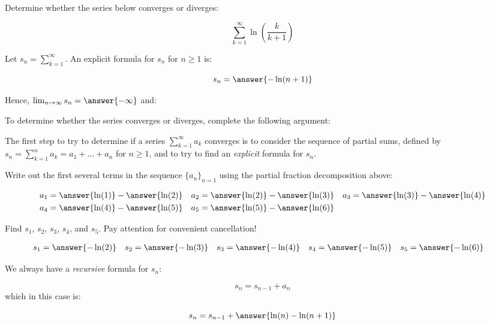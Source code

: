 \documentclass{ximera}
\author{Jim Talamo}
\begin{document}
\begin{exercise}
Determine whether the series below converges or diverges:

\[
\sum_{k=1}^{\infty} \ln \left(\frac{k}{k+1}\right)
\]

Let $s_n = \sum_{k=1}^{\infty}$.  An explicit formula for $s_n$ for $n \geq 1$ is:

\[
s_n = \answer{-\ln(n+1)}
\]

\begin{exercise}
Hence, $\lim_{n \to \infty} s_n = \answer{-\infty}$ and:

\begin{multipleChoice}
\end{multipleChoice}

\begin{hint}
To determine whether the series converges or diverges, complete the following argument:

The first step to try to determine if a series $\sum_{k=1}^{\infty}a_k$ converges is to consider the sequence of partial sums, defined by $s_n = \sum_{k=1}^{n} a_k = a_1+\ldots + a_n$ for $n \geq 1$, and to try to find an \emph{explicit} formula for $s_n$.


Write out the first several terms in the sequence $\{a_n\}_{n=1}$ using the partial fraction decomposition above:

\begin{align*}
a_1 &= \answer{\ln(1)} - \answer{\ln(2)} & a_2 &= \answer{\ln(2)}-\answer{\ln(3)} & a_3 &= \answer{\ln(3)}-\answer{\ln(4)} \\
 a_4 &= \answer{\ln(4)}-\answer{\ln(5)}& a_5 &= \answer{\ln(5)}-\answer{\ln(6)}
\end{align*}

\begin{question}
Find $s_1$, $s_2$, $s_3$, $s_4$, and $s_5$.  Pay attention for convenient cancellation!

\begin{align*}
s_1 &= \answer{-\ln(2)} & s_2 &=  \answer{-\ln(3)} & s_3 &=  \answer{-\ln(4)} & s_4 &= \answer{-\ln(5)}& s_5 &= \answer{-\ln(6)} 
\end{align*}

\begin{question}
We always have a \emph{recursive} formula for $s_n$:

\[
s_n = s_{n-1} +a_n
\]
 which in this case is:
 
 \[
 s_n= s_{n-1} + \answer{\ln(n)-\ln(n+1)}
 \]
 

\end{question}
\end{question}
\end{hint}
\end{exercise}
\end{exercise}
\end{document}
